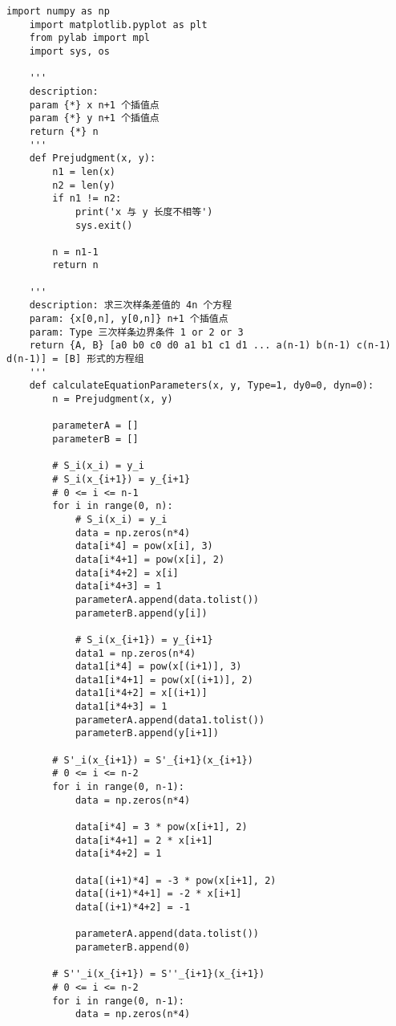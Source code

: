 \begin{lstlisting}[style = python]
    import numpy as np
    import matplotlib.pyplot as plt
    from pylab import mpl
    import sys, os
    
    '''
    description: 
    param {*} x n+1 个插值点
    param {*} y n+1 个插值点
    return {*} n
    '''
    def Prejudgment(x, y):
        n1 = len(x)
        n2 = len(y)
        if n1 != n2:
            print('x 与 y 长度不相等')
            sys.exit()
        
        n = n1-1
        return n
            
    '''
    description: 求三次样条差值的 4n 个方程
    param: {x[0,n], y[0,n]} n+1 个插值点
    param: Type 三次样条边界条件 1 or 2 or 3
    return {A, B} [a0 b0 c0 d0 a1 b1 c1 d1 ... a(n-1) b(n-1) c(n-1) d(n-1)] = [B] 形式的方程组 
    '''
    def calculateEquationParameters(x, y, Type=1, dy0=0, dyn=0):
        n = Prejudgment(x, y)
    
        parameterA = []
        parameterB = []
        
        # S_i(x_i) = y_i
        # S_i(x_{i+1}) = y_{i+1}
        # 0 <= i <= n-1
        for i in range(0, n):
            # S_i(x_i) = y_i
            data = np.zeros(n*4)
            data[i*4] = pow(x[i], 3)
            data[i*4+1] = pow(x[i], 2)
            data[i*4+2] = x[i]
            data[i*4+3] = 1
            parameterA.append(data.tolist())
            parameterB.append(y[i])
            
            # S_i(x_{i+1}) = y_{i+1}
            data1 = np.zeros(n*4)
            data1[i*4] = pow(x[(i+1)], 3)
            data1[i*4+1] = pow(x[(i+1)], 2)
            data1[i*4+2] = x[(i+1)]
            data1[i*4+3] = 1
            parameterA.append(data1.tolist())
            parameterB.append(y[i+1])
    
        # S'_i(x_{i+1}) = S'_{i+1}(x_{i+1})
        # 0 <= i <= n-2
        for i in range(0, n-1):
            data = np.zeros(n*4)
    
            data[i*4] = 3 * pow(x[i+1], 2)
            data[i*4+1] = 2 * x[i+1]
            data[i*4+2] = 1
    
            data[(i+1)*4] = -3 * pow(x[i+1], 2)
            data[(i+1)*4+1] = -2 * x[i+1]
            data[(i+1)*4+2] = -1
            
            parameterA.append(data.tolist())
            parameterB.append(0)
    
        # S''_i(x_{i+1}) = S''_{i+1}(x_{i+1})
        # 0 <= i <= n-2
        for i in range(0, n-1):
            data = np.zeros(n*4)
    

\end{lstlisting}
